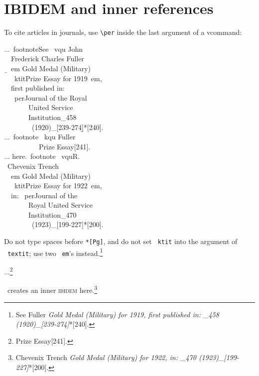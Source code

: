 \documentclass[12pt,a4paper]{article}
\newcommand{\pbs}{\string\ \unskip}
\newcommand{\bs}{\protect\pbs}
\renewcommand{\{}{{\normalfont\lbashortmem}}
\renewcommand{\}}{{\normalfont\rbashortmem}}
\begin{document}
\section{IBIDEM and inner references}
 
 To cite articles in journals, use \verb|\per| inside the last argument of a
 v\fhy command:

\Doppelbox
{
...\bs footnote\{See \bs vqu \{John 
\\ \ \ Frederick Charles\} \{Fuller\} 
\\ \ \b{\{}\bs em Gold Medal (Military) 
\\ \ \ \bs ktit\{Prize Essay\} for 1919\bs em, 
\\ \ \ first published in: 
\\ \ \ \bs per\{Journal of the Royal 
\\ \ \ \ \ \ \ \ United Service 
\\ \ \ \ \ \ \ \ Institution\}\string_458 
\\ \ \ \ \ \ \ \ \ (1920)\string_[239-274]\b{\}}*[240].\}
\\[1.5ex]
...\bs footnote\{ \bs kqu \{Fuller\} 
\\ \ \ \ \ \ \ \ \ \ \ \{Prize Essay\}[241].\}
\\[1.5ex]
... here.\bs footnote\{ \bs vqu\{R.\} 
\\ \ \{Chevenix Trench\} 
\\ \ \{\bs em Gold Medal (Military) 
\\ \ \ \bs ktit\{Prize Essay\} for 1922\bs em, 
\\ \ \ in: \bs per\{Journal of the 
\\ \ \ \ \ \ \ \ Royal United Service 
\\ \ \ \ \ \ \ \ Institution\}\string_470 
\\ \ \ \ \ \ \ \ \ (1923)\string_[199-227]\}*[200].\}
}
{
Do not type spaces before \texttt{*[Pg]},
and do not set \texttt{\bs ktit} into 
the argument of \texttt{\bs textit};
use two \texttt{\bs em}'s instead.\footnote{See 
 {Fuller} 
{\em Gold Medal (Military)  for 1919\em, 
first published in: _458 (1920)_[239-274]}*[240].}

...\footnote{  {Prize Essay}[241].}

\BibArts\ creates an inner \textsc{ibidem} 
here.\footnote{  
{Chevenix Trench} 
{\em Gold Medal (Military)  for 1922\em, 
in: _470 (1923)_[199-227]}*[200].\label{third}}
}
\end{document}
